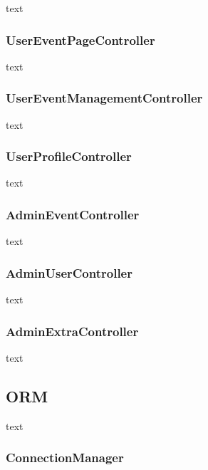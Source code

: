 \documentclass[11pt]{article}
\begin{document}
                text

            \subsubsection{UserEventPageController} \label{subsubsec:user-event-page-controller}

                text

            \subsubsection{UserEventManagementController} \label{subsubsec:user-event-management-controller}

                text

            \subsubsection{UserProfileController} \label{subsubsec:user-profile-controller}

                text

            \subsubsection{AdminEventController} \label{subsubsec:admin-event-controller}

                text

            \subsubsection{AdminUserController} \label{subsubsec:admin-user-controller}

                text

            \subsubsection{AdminExtraController} \label{subsubsec:admin-extra-controller}

                text

        \subsection{ORM} \label{subsec:orm}

            text

            \subsubsection{ConnectionManager} \label{subsubsec:connection-manager}
\end{document}
